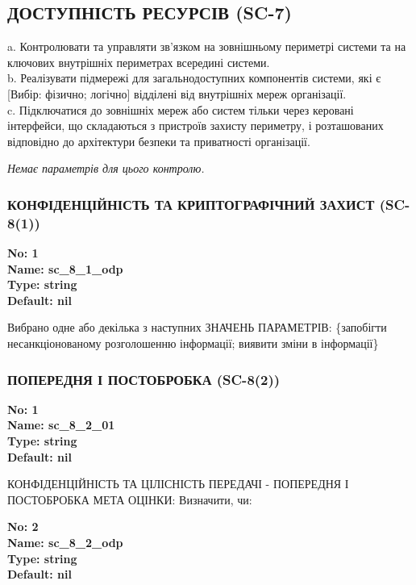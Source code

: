 \documentclass{article}
\begin{document}
\subsection{ДОСТУПНІСТЬ РЕСУРСІВ (SC-7)}
a. Контролювати та управляти зв'язком на зовнішньому периметрі системи та на ключових внутрішніх периметрах всередині системи.\\ 
b. Реалізувати підмережі для загальнодоступних компонентів системи, які є [Вибір: фізично; логічно] відділені від внутрішніх мереж організації.\\ 
c. Підключатися до зовнішніх мереж або систем тільки через керовані інтерфейси, що складаються з пристроїв захисту периметру, і розташованих відповідно до архітектури безпеки та приватності організації.

\vspace{10pt}
\textit{Немає параметрів для цього контролю.}
\vspace{10pt}


\subsubsection{КОНФІДЕНЦІЙНІСТЬ ТА КРИПТОГРАФІЧНИЙ ЗАХИСТ (SC-8(1))}


\vspace{10pt}
{\footnotesize\bfseries
No: 1\\
Name: sc\_\allowbreak{}8\_\allowbreak{}1\_\allowbreak{}odp\\
Type: string\\
Default: nil
}

{\footnotesize Вибрано одне або декілька з наступних ЗНАЧЕНЬ ПАРАМЕТРІВ: \{запобігти несанкціонованому розголошенню інформації; виявити зміни в інформації\}}




\subsubsection{ПОПЕРЕДНЯ І ПОСТОБРОБКА (SC-8(2))}


\vspace{10pt}
{\footnotesize\bfseries
No: 1\\
Name: sc\_\allowbreak{}8\_\allowbreak{}2\_\allowbreak{}01\\
Type: string\\
Default: nil
}

{\footnotesize КОНФІДЕНЦІЙНІСТЬ ТА ЦІЛІСНІСТЬ ПЕРЕДАЧІ - ПОПЕРЕДНЯ І ПОСТОБРОБКА МЕТА ОЦІНКИ: Визначити, чи:}


{\footnotesize\bfseries
No: 2\\
Name: sc\_\allowbreak{}8\_\allowbreak{}2\_\allowbreak{}odp\\
Type: string\\
Default: nil
}
\end{document}
